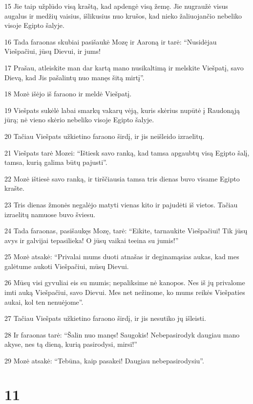 \par 15 Jie taip užplūdo visą kraštą, kad apdengė visą žemę. Jie nugraužė visus augalus ir medžių vaisius, išlikusius nuo krušos, kad nieko žaliuojančio nebeliko visoje Egipto šalyje. 
\par 16 Tada faraonas skubiai pasišaukė Mozę ir Aaroną ir tarė: “Nusidėjau Viešpačiui, jūsų Dievui, ir jums! 
\par 17 Prašau, atleiskite man dar kartą mano nusikaltimą ir melskite Viešpatį, savo Dievą, kad Jis pašalintų nuo manęs šitą mirtį”. 
\par 18 Mozė išėjo iš faraono ir meldė Viešpatį. 
\par 19 Viešpats sukėlė labai smarkų vakarų vėją, kuris skėrius nupūtė į Raudonąją jūrą; nė vieno skėrio nebeliko visoje Egipto šalyje. 
\par 20 Tačiau Viešpats užkietino faraono širdį, ir jis neišleido izraelitų. 
\par 21 Viešpats tarė Mozei: “Ištiesk savo ranką, kad tamsa apgaubtų visą Egipto šalį, tamsa, kurią galima būtų pajusti”. 
\par 22 Mozė ištiesė savo ranką, ir tirščiausia tamsa tris dienas buvo visame Egipto krašte. 
\par 23 Tris dienas žmonės negalėjo matyti vienas kito ir pajudėti iš vietos. Tačiau izraelitų namuose buvo šviesu. 
\par 24 Tada faraonas, pasišaukęs Mozę, tarė: “Eikite, tarnaukite Viešpačiui! Tik jūsų avys ir galvijai tepasilieka! O jūsų vaikai teeina su jumis!” 
\par 25 Mozė atsakė: “Privalai mums duoti atnašas ir deginamąsias aukas, kad mes galėtume aukoti Viešpačiui, mūsų Dievui. 
\par 26 Mūsų visi gyvuliai eis su mumis; nepaliksime nė kanopos. Nes iš jų privalome imti auką Viešpačiui, savo Dievui. Mes net nežinome, ko mums reikės Viešpaties aukai, kol ten nenuėjome”. 
\par 27 Tačiau Viešpats užkietino faraono širdį, ir jis nesutiko jų išleisti. 
\par 28 Ir faraonas tarė: “Šalin nuo manęs! Saugokis! Nebepasirodyk daugiau mano akyse, nes tą dieną, kurią pasirodysi, mirsi!” 
\par 29 Mozė atsakė: “Tebūna, kaip pasakei! Daugiau nebepasirodysiu”.



\chapter{11}


